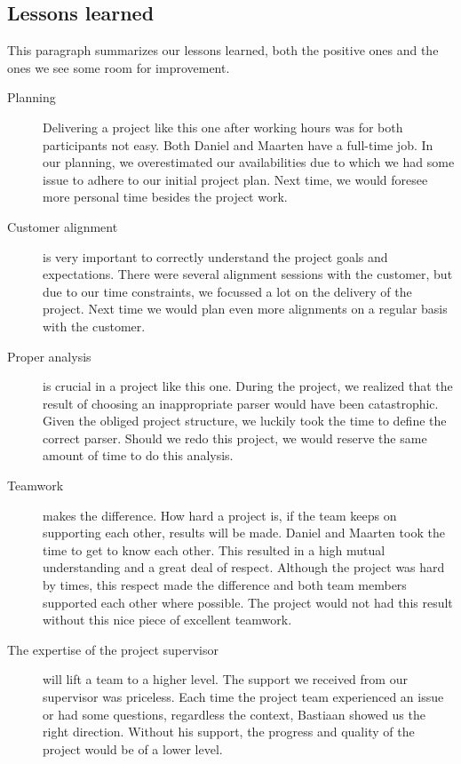 
\subsection{Lessons learned}
\label{assessment:lessons-learned}
This paragraph summarizes our lessons learned, both the positive ones and the ones we see some room for improvement.

  \begin{description}	  
    \item[Planning] Delivering a project like this one after working hours was for both participants not easy. 
	  Both Daniel and Maarten have a full-time job.
	  In our planning, we overestimated our availabilities due to which we had some issue to adhere to our initial project plan.
	  Next time, we would foresee more personal time besides the project work.
	
    \item[Customer alignment] is very important to correctly understand the project goals and expectations.
	  There were several alignment sessions with the customer, but due to our time constraints, we focussed  a lot on the delivery of the project. 
	  Next time we would plan even more alignments on a regular basis with the customer.	  
    
    \item[Proper analysis] is crucial in a project like this one.
	  During the project, we realized that the result of choosing an inappropriate parser would have been catastrophic.
	  Given the obliged project structure, we luckily took the time to define the correct parser.
      Should we redo this project, we would reserve the same amount of time to do this analysis.
    
    \item[Teamwork] makes the difference.
	  How hard a project is, if the team keeps on supporting each other, results will be made.
	  Daniel and Maarten took the time to get to know each other.
	  This resulted in a high mutual understanding and a great deal of respect.
	  Although the project was hard by times, this respect made the difference and both team members supported each other where possible.
	  The project would not had this result without this nice piece of excellent teamwork.
	 
	 \item[The expertise of the project supervisor] will lift a team to a higher level.
	  The support we received from our supervisor was priceless.
	  Each time the project team experienced an issue or had some questions, regardless the context, Bastiaan showed us the right direction.
	  Without his support, the progress and quality of the project would be of a lower level.
	  
	  
  \end{description}

